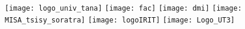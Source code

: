 \sloppy
{}
\begin{titlepage}
\begin{center}
  \texttt{[image: logo\_univ\_tana]}
  \hspace*{1cm}\texttt{[image: fac]}
  \hspace*{1cm}\texttt{[image: dmi]}
  \hspace*{1cm}\texttt{[image: MISA\_tsisy\_soratra]}
  \hspace*{1cm}\texttt{[image: logoIRIT]}
  \hspace*{1cm}\texttt{[image: Logo\_UT3]}
  \vspace{1cm}\\
\end{center}
%
%
%
%
%
%

\end{titlepage}
